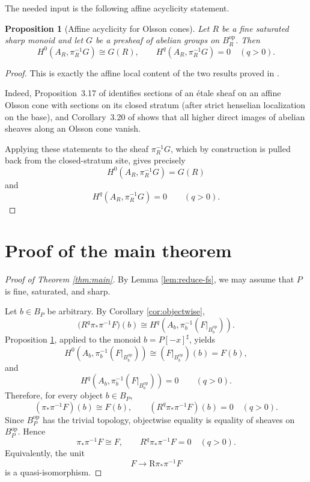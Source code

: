 \documentclass[11pt]{article}
\newtheorem{proposition}[theorem]{Proposition}
\theoremstyle{remark}
\newcommand{\R}{\mathrm{R}}
\begin{document}
The needed input is the following affine acyclicity statement.

\begin{proposition}[Affine acyclicity for Olsson cones]\label{prop:aff-acyclic}
Let $R$ be a fine saturated sharp monoid and let $G$ be a presheaf of abelian groups
on $B_R^{\mathrm{op}}$.
Then
\[
H^0\!\left(A_R,\pi_R^{-1}G\right)\cong G(R),
\qquad
H^q\!\left(A_R,\pi_R^{-1}G\right)=0 \quad (q>0).
\]
\end{proposition}

\begin{proof}
This is exactly the affine local content of the two results proved in
\cite[Prop.~3.17 and Cor.~3.20]{BCW}.

Indeed, Proposition~3.17 of \cite{BCW} identifies sections of an \'{e}tale sheaf on an
affine Olsson cone with sections on its closed stratum (after strict henselian
localization on the base), and Corollary~3.20 of \cite{BCW} shows that all higher direct
images of abelian sheaves along an Olsson cone vanish.

Applying these statements to the sheaf $\pi_R^{-1}G$, which by construction is pulled
back from the closed-stratum site, gives precisely
\[
H^0(A_R,\pi_R^{-1}G)=G(R)
\]
and
\[
H^q(A_R,\pi_R^{-1}G)=0\qquad(q>0).
\]
\end{proof}

\section{Proof of the main theorem}

\begin{proof}[Proof of Theorem \ref{thm:main}]
By Lemma \ref{lem:reduce-fs}, we may assume that $P$ is fine, saturated, and sharp.

Let $b\in B_P$ be arbitrary.  By Corollary \ref{cor:objectwise},
\[
\bigl(R^q\pi_*\pi^{-1}F\bigr)(b)
\cong
H^q\!\left(A_b,\pi_b^{-1}(F|_{B_b^{\mathrm{op}}})\right).
\]
Proposition \ref{prop:aff-acyclic}, applied to the monoid $b=P[-x]^\sharp$, yields
\[
H^0\!\left(A_b,\pi_b^{-1}(F|_{B_b^{\mathrm{op}}})\right)
\cong
(F|_{B_b^{\mathrm{op}}})(b)
=
F(b),
\]
and
\[
H^q\!\left(A_b,\pi_b^{-1}(F|_{B_b^{\mathrm{op}}})\right)=0
\qquad(q>0).
\]
Therefore, for every object $b\in B_P$,
\[
(\pi_*\pi^{-1}F)(b)\cong F(b),
\qquad
(R^q\pi_*\pi^{-1}F)(b)=0\quad(q>0).
\]
Since $B_P^{\mathrm{op}}$ has the trivial topology, objectwise equality is equality of
sheaves on $B_P^{\mathrm{op}}$. Hence
\[
\pi_*\pi^{-1}F \cong F,
\qquad
R^q\pi_*\pi^{-1}F=0\quad(q>0).
\]
Equivalently, the unit
\[
F\longrightarrow \R\pi_*\pi^{-1}F
\]
is a quasi-isomorphism.
\end{proof}
\end{document}

